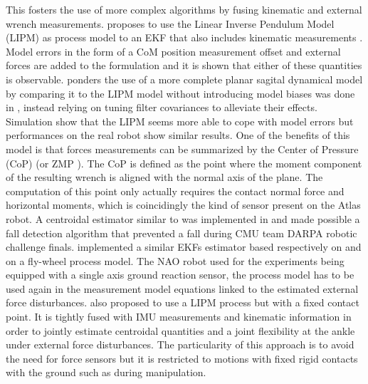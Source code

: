 This fosters the use of more complex algorithms by fusing kinematic and external wrench measurements. \cite{stephens2011state} proposes to use the 
Linear Inverse Pendulum Model (LIPM) as process model to an EKF that also includes kinematic measurements . Model errors in the form of a CoM position measurement offset and external forces are added to the formulation and it is shown that
either of these quantities is observable. \cite{atkeson2012state} ponders the use of a more complete planar sagital dynamical model by comparing it to the LIPM model
without introducing model biases was done in \cite{stephens2011state}, instead relying on tuning filter covariances to alleviate their effects. 
Simulation show that the LIPM seems more able to cope with model errors but performances on the real robot show similar results. 
One of the benefits of this model is that forces measurements can be summarized by the Center of Pressure (CoP) 
(or ZMP \cite{sardain2004forces}). The CoP is defined as the point where the moment component of the resulting wrench is aligned with the normal axis of the plane.
The computation of this point only actually requires the contact normal force and horizontal moments, which is coincidingly the kind of
sensor present on the Atlas robot. A centroidal estimator similar to \cite{stephens2011state} was implemented in \cite{xinjilefu2015center} and made possible
a fall detection algorithm that prevented a fall during CMU team DARPA robotic challenge finals. \cite{piperakis2016non, piperakis2018nonlinear} implemented a similar 
EKFs estimator based respectively on and on a fly-wheel process model. The NAO robot used for the experiments being equipped with a single axis ground reaction sensor,
the process model has to be used again in the measurement model equations linked to the estimated external force disturbances.   
\cite{benallegue2015estimation} also proposed to use a LIPM process but with a fixed contact point. It is tightly fused with IMU 
measurements and kinematic information in order to jointly estimate centroidal quantities 
and a joint flexibility at the ankle under external force disturbances. The particularity of this approach is to avoid the need for force sensors but
it is restricted to motions with fixed rigid contacts with the ground such as during manipulation.

